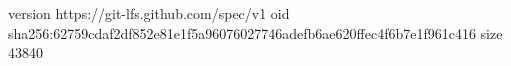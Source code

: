 version https://git-lfs.github.com/spec/v1
oid sha256:62759cdaf2df852e81e1f5a96076027746adefb6ae620ffec4f6b7e1f961c416
size 43840
